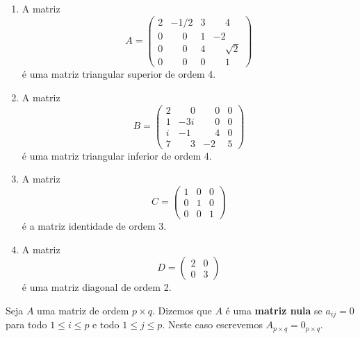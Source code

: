\begin{exemplos}
    \begin{enumerate}
        \item A matriz
            \[
                A = \begin{pmatrix}
                    2 & -1/2 & 3 & \phantom{-}4\\
                    0 & \phantom{-}0 & 1 & -2\\
                    0 & \phantom{-}0 & 4 & \phantom{-}\sqrt{2}\\
                    0 & \phantom{-}0 & 0 & \phantom{-}1
                \end{pmatrix}
            \]
        é uma matriz triangular superior de ordem 4.
        \item A matriz
            \[
                B = \begin{pmatrix}
                    2 & \phantom{-}0 & \phantom{-}0 & 0\\
                    1 & -3i & \phantom{-}0 & 0\\
                    i & -1 & \phantom{-}4 & 0\\
                    7 & \phantom{-}3 & -2 & 5
                \end{pmatrix}
            \]
        é uma matriz triangular inferior de ordem 4.
        \item A matriz
            \[
                C = \begin{pmatrix}
                    1 & 0 & 0\\
                    0 & 1 & 0\\
                    0 & 0 & 1
                \end{pmatrix}
            \]
        é a matriz identidade de ordem 3.
        \item A matriz
            \[
                D = \begin{pmatrix}
                    2 & 0\\
                    0 & 3
                \end{pmatrix}
            \]
        é uma matriz diagonal de ordem 2.
    \end{enumerate}
\end{exemplos}

\begin{definicao}
    Seja $A$ uma matriz de ordem $p\times q$. Dizemos que $A$ é uma \textbf{matriz nula} se $a_{ij} = 0$ para todo $1 \le i \le p$ e todo $1 \le j \le p$. Neste caso escrevemos $A_{p\times q} = 0_{p\times q}$.
\end{definicao}

